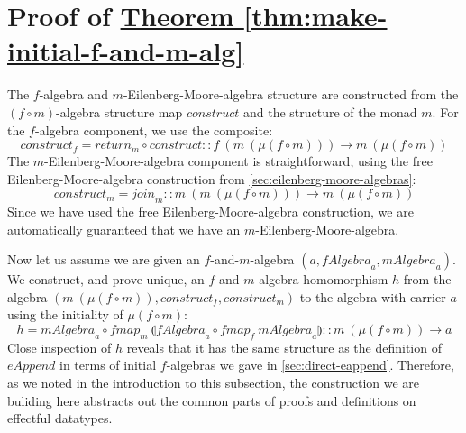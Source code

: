 \documentclass{jfp1}
\newcommand{\fold}[1]{\llparenthesis #1 \rrparenthesis}
\newcommand{\thmref}[1]{\hyperref[#1]{Theorem \ref*{#1}}}
\begin{document}



\appendix

\section{Proof of \thmref{thm:make-initial-f-and-m-alg}}
\label{sec:make-initial-fm-proof}

\begin{proof*}
  The $f$-algebra and $m$-Eilenberg-Moore-algebra structure are
  constructed from the $(f \circ m)$-algebra structure map
  $\mathit{construct}$ and the structure of the monad $m$.  For the
  $f$-algebra component, we use the composite:
  \begin{displaymath}
    \mathit{construct}_f = \mathit{return}_m \circ \mathit{construct} :: f~(m~(\mu(f \circ m))) \to m~(\mu(f \circ m))
  \end{displaymath}
  The $m$-Eilenberg-Moore-algebra component is straightforward, using
  the free Eilenberg-Moore-algebra construction from
  \autoref{sec:eilenberg-moore-algebras}:
  \begin{displaymath}
    \mathit{construct}_m = \mathit{join}_m :: m~(m~(\mu(f \circ m))) \to m~(\mu(f \circ m))
  \end{displaymath}
  Since we have used the free Eilenberg-Moore-algebra construction, we
  are automatically guaranteed that we have an
  $m$-Eilenberg-Moore-algebra.

  Now let us assume we are given an $f$-and-$m$-algebra $(a,
  \mathit{fAlgebra}_a, \mathit{mAlgebra}_a)$. We construct, and prove
  unique, an $f$-and-$m$-algebra homomorphism $h$ from the algebra
  $(m~(\mu(f \circ m)), \mathit{construct}_f, \mathit{construct}_m)$
  to the algebra with carrier $a$ using the initiality of $\mu(f \circ
  m)$:
  \begin{displaymath}
    h = \mathit{mAlgebra}_a \circ \mathit{fmap}_m~\fold{\mathit{fAlgebra}_a \circ \mathit{fmap}_f~\mathit{mAlgebra}_a} :: m~(\mu(f \circ m)) \to a
  \end{displaymath}
  Close inspection of $h$ reveals that it has the same structure as
  the definition of $\mathit{eAppend}$ in terms of initial
  $f$-algebras we gave in \autoref{sec:direct-eappend}. Therefore, as
  we noted in the introduction to this subsection, the construction we
  are buliding here abstracts out the common parts of proofs and
  definitions on effectful datatypes.


\end{proof*}
\end{document}

